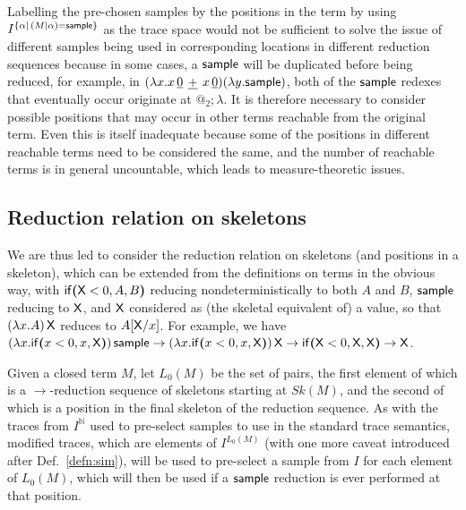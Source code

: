 Labelling the pre-chosen samples by the positions in the term by using $I^{\{\alpha \mid \, (M \mid \alpha) = \mathsf{sample}\}}$ as the trace space would not be sufficient to solve the issue of different samples being used in corresponding locations in different reduction sequences because in some cases, a $\mathsf{sample}$ will be duplicated before being reduced, for example, in $(\lambda x. x \, {\underline 0} \, \mathbin{\underline{+}} \, {x \, \underline 0}) (\lambda y. \mathsf{sample})$, both of the $\mathsf{sample}$ redexes that eventually occur originate at $@_2 ; \lambda$. 
It is therefore necessary to consider possible positions that may occur in other terms reachable from the original term. 
Even this is itself inadequate because some of the positions in different reachable terms need to be considered the same, and the number of reachable terms is in general uncountable, which leads to measure-theoretic issues.

\subsection{Reduction relation on skeletons} We are thus led to consider the reduction relation on skeletons (and positions in a skeleton), which can be extended from the definitions on terms in the obvious way, with $\mathsf{if}\boldsymbol{(}\mathsf{X} < 0, A, B\boldsymbol{)}$ reducing nondeterministically to both $A$ and $B$, $\mathsf{sample}$ reducing to $\mathsf{X}$, and $\mathsf{X}$ considered as (the skeletal equivalent of) a value, so that $(\lambda x.A) \, \mathsf{X}$ reduces to $A[\mathsf{X} / x]$.
For example, we have 
\(
(\lambda x . \mathsf{if}\boldsymbol{(}x < 0, x, \mathsf{X}\boldsymbol{)}) \, \mathsf{sample}
\to
(\lambda x . \mathsf{if}\boldsymbol{(}x < 0, x, \mathsf{X}\boldsymbol{)}) \, \mathsf{X}
\to
\mathsf{if}\boldsymbol{(}\mathsf{X} < 0, \mathsf{X}, \mathsf{X}\boldsymbol{)}
\to
\mathsf{X}
\).

Given a closed term $M$, let $L_0(M)$ be the set of pairs, the first element of which is a $\to$-reduction sequence of skeletons starting at $\mathit{Sk}(M)$, and the second of which is a position in the final skeleton of the reduction sequence. 
As with the traces from $I^{\mathbb N}$ used to pre-select samples to use in the standard trace semantics, modified traces, which are elements of $I^{L_0(M)}$ (with one more caveat introduced after Def.~\ref{defn:sim}), will be used to pre-select a sample from $I$ for each element of $L_0(M)$, which will then be used if a $\mathsf{sample}$ reduction is ever performed at that position.


